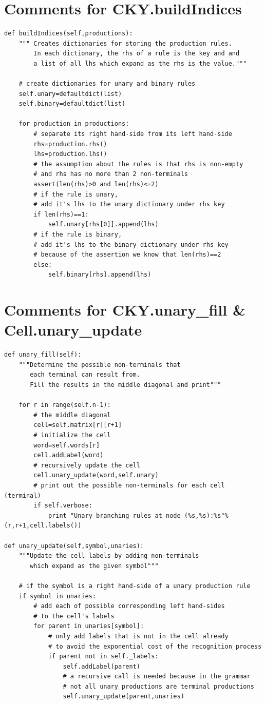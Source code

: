 \documentclass{article}
\begin{document}
\section{Comments for CKY.buildIndices}

\begin{lstlisting}
def buildIndices(self,productions):
	""" Creates dictionaries for storing the production rules.
	    In each dictionary, the rhs of a rule is the key and and
	    a list of all lhs which expand as the rhs is the value."""
	
	# create dictionaries for unary and binary rules
	self.unary=defaultdict(list)
	self.binary=defaultdict(list)
	
	for production in productions:
		# separate its right hand-side from its left hand-side
		rhs=production.rhs()
		lhs=production.lhs()
		# the assumption about the rules is that rhs is non-empty
		# and rhs has no more than 2 non-terminals
		assert(len(rhs)>0 and len(rhs)<=2)
		# if the rule is unary, 
		# add it's lhs to the unary dictionary under rhs key
		if len(rhs)==1:
			self.unary[rhs[0]].append(lhs)
		# if the rule is binary, 
		# add it's lhs to the binary dictionary under rhs key
		# because of the assertion we know that len(rhs)==2
		else:
			self.binary[rhs].append(lhs)
\end{lstlisting}

\hfill \break


\section{Comments for CKY.unary\_fill \& Cell.unary\_update}
\begin{lstlisting}
def unary_fill(self):
	"""Determine the possible non-terminals that 
	   each terminal can result from. 
	   Fill the results in the middle diagonal and print"""
	
	for r in range(self.n-1):
		# the middle diagonal
		cell=self.matrix[r][r+1]
		# initialize the cell
		word=self.words[r]
		cell.addLabel(word)
		# recursively update the cell
		cell.unary_update(word,self.unary)
		# print out the possible non-terminals for each cell (terminal)
		if self.verbose:
			print "Unary branching rules at node (%s,%s):%s"%(r,r+1,cell.labels())
			
def unary_update(self,symbol,unaries):
	"""Update the cell labels by adding non-terminals 
	   which expand as the given symbol"""
	   
	# if the symbol is a right hand-side of a unary production rule
	if symbol in unaries:
		# add each of possible corresponding left hand-sides
		# to the cell's labels
		for parent in unaries[symbol]:
			# only add labels that is not in the cell already
			# to avoid the exponential cost of the recognition process
			if parent not in self._labels:
				self.addLabel(parent)
				# a recursive call is needed because in the grammar 
				# not all unary productions are terminal productions
				self.unary_update(parent,unaries)
\end{lstlisting}
\end{document}
